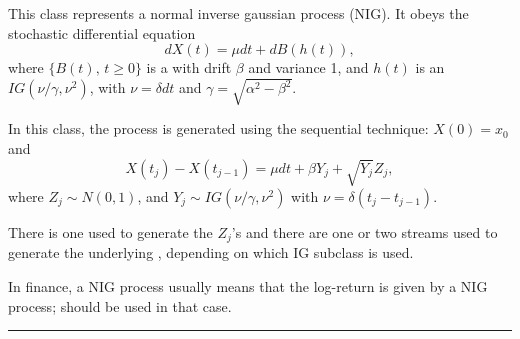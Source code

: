 
This class represents a normal inverse gaussian process (NIG).
It obeys the stochastic differential equation \cite{pBAR98a}
\begin{equation}
   dX(t) = \mu dt + dB(h(t)), \label{eq:nig}
\end{equation}
where $\{B(t),\, t\ge 0\}$ is a  
with drift $\beta$ and variance 1,
and $h(t)$ is an  $IG(\nu/\gamma,\nu^2)$, with 
$\nu = \delta dt$ and $\gamma = \sqrt{\alpha^2 - \beta^2}$.

In this class, the process is generated using the sequential
technique:  $X(0)=x_0$ and 
\begin{equation}
   X(t_j) - X(t_{j-1}) =\mu dt +  \beta Y_j + \sqrt{Y_j} Z_j, 
\end{equation}
where $Z_j \sim N(0,1)$, and $Y_j \sim IG(\nu/\gamma,\nu^2)$
with $\nu = \delta(t_j - t_{j-1})$.   

There is one  
used to generate the $Z_j$'s and
there are one or two streams used to generate the underlying
, depending on which IG subclass
is used.

In finance, a NIG process usually means that
the log-return is given by a NIG process;
should be used in that case.


\bigskip\hrule\bigskip

